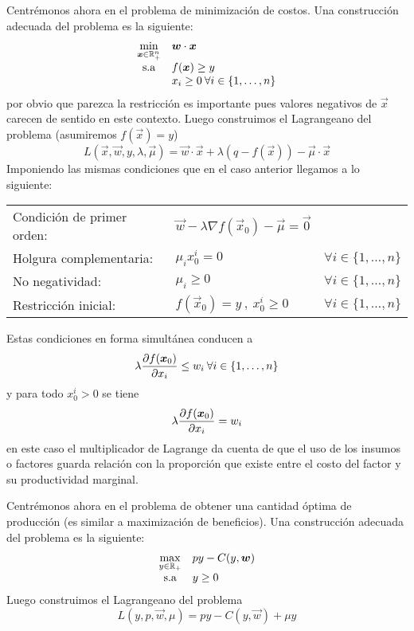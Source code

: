 Centr\'emonos ahora en el problema de minimizaci\'on de costos. Una construcci\'on adecuada del problema es la siguiente:
\begin{equation*}
	\begin{array}{cl}
	\displaystyle \min_{\boldsymbol{x}\in \mathbb{R}^n_+} & \boldsymbol{w}\cdot \boldsymbol{x} \\
	\text{s.a}				 & f(\boldsymbol{x})\geq y \\
							 & x_i \geq 0 \:\forall i\in\{1,\ldots,n\}
	\end{array}
\end{equation*}
por obvio que parezca la restricci\'on es importante pues valores negativos de $\vec{x}$ carecen de sentido en este contexto. Luego construimos el Lagrangeano del problema (asumiremos $f(\vec{x})=y$)
$$L(\vec{x},\vec{w},y,\lambda,\vec{\mu})=\vec{w}\cdot \vec{x} + \lambda (q-f(\vec{x})) - \vec{\mu}\cdot \vec{x}$$
Imponiendo las mismas condiciones que en el caso anterior llegamos a lo siguiente:

\begin{center}
\begin{tabular}{llr}
Condici\'on de primer orden: & $\vec{w} - \lambda \nabla f(\vec{x}_0) - \vec{\mu} = \vec{0}$ & \\
Holgura complementaria: & $\mu_i x_{0}^{i} = 0$ & $\forall i\in\{1,\ldots , n\}$ \\
No negatividad: & $\mu_i \geq 0$ & $\forall i\in\{1,\ldots , n\}$ \\
Restricci\'on inicial: & $f(\vec{x}_0)=y \:,\: x_{0}^{i} \geq 0$ & $\forall i\in\{1,\ldots , n\}$
\end{tabular}
\end{center}

Estas condiciones en forma simult\'anea conducen a 
$$\lambda \frac{\partial f(\boldsymbol{x}_{0})}{\partial x_i}\leq w_i \:\forall i\in\{1,\ldots , n\}$$
y para todo $x_{0}^i>0$ se tiene
$$\lambda \frac{\partial f(\boldsymbol{x}_{0})}{\partial x_i}= w_i$$
en este caso el multiplicador de Lagrange da cuenta de que el uso de los insumos o factores guarda relaci\'on con la proporci\'on que existe entre el costo del factor y su productividad marginal.

Centr\'emonos ahora en el problema de obtener una cantidad \'optima de producci\'on (es similar a maximizaci\'on de beneficios). Una construcci\'on adecuada del problema es la siguiente:
\begin{equation*}
	\begin{array}{cl}
	\displaystyle \max_{y\in \mathbb{R}_+} & py - C(y,\boldsymbol{w}) \\
	\text{s.a}				 & y\geq 0
	\end{array}
\end{equation*}
Luego construimos el Lagrangeano del problema
$$L(y,p,\vec{w},\mu)=py - C(y,\vec{w}) + \mu y$$


